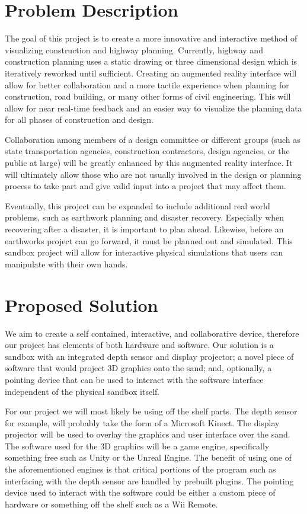 \documentclass[onecolumn, draftclsnofoot,10pt, compsoc]{IEEEtran}
\begin{document}
\section{Problem Description}
The goal of this project is to create a more innovative and interactive method of visualizing construction and highway planning.
Currently, highway and construction planning uses a static drawing or three dimensional design which is iteratively reworked until sufficient.
Creating an augmented reality interface will allow for better collaboration and a more tactile experience when planning for construction, road building, or many other forms of civil engineering.
This will allow for near real-time feedback and an easier way to visualize the planning data for all phases of construction and design.
\par
Collaboration among members of a design committee or different groups (such as state transportation agencies, construction contractors, design agencies, or the public at large) will be greatly enhanced by this augmented reality interface.
It will ultimately allow those who are not usually involved in the design or planning process to take part and give valid input into a project that may affect them.
\par
Eventually, this project can be expanded to include additional real world  problems, such as earthwork planning and disaster recovery.
Especially when recovering after a disaster, it is important to plan ahead. Likewise, before an earthworks project can go forward, it must be planned out and simulated.
This sandbox project will allow for interactive physical simulations that users can manipulate with their own hands.

\section{Proposed Solution}
We aim to create a self contained, interactive, and collaborative device, therefore our project has elements of both hardware and software.
Our solution is a sandbox with an integrated depth sensor and display projector; a novel piece of software that would project 3D graphics onto the sand; and, optionally, a pointing device that can be used to interact with the software interface independent of the physical sandbox itself.
\par
For our project we will most likely be using off the shelf parts.
The depth sensor for example, will probably take the form of a Microsoft Kinect.
The display projector will be used to overlay the graphics and user interface over the sand.
The software used for the 3D graphics will be a game engine, specifically something free such as Unity or the Unreal Engine.
The benefit of using one of the aforementioned engines is that critical portions of the program such as interfacing with the depth sensor are handled by prebuilt plugins.
The pointing device used to interact with the software could be either a custom piece of hardware or something off the shelf such as a Wii Remote.
\end{document}
